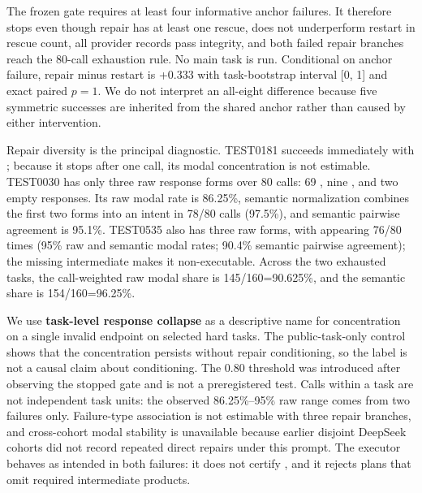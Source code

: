 \documentclass{article}
\begin{document}
The frozen gate requires at least four informative anchor failures. It therefore stops even though repair has at least one rescue, does not underperform restart in rescue count, all provider records pass integrity, and both failed repair branches reach the 80-call exhaustion rule. No main task is run. Conditional on anchor failure, repair minus restart is +0.333 with task-bootstrap interval [0, 1] and exact paired \(p=1\). We do not interpret an all-eight difference because five symmetric successes are inherited from the shared anchor rather than caused by either intervention.

Repair diversity is the principal diagnostic. TEST0181 succeeds immediately with \texttt{}; because it stops after one call, its modal concentration is not estimable. TEST0030 has only three raw response forms over 80 calls: 69 \texttt{\detokenize{["IMPOSSIBLE"]}}, nine \texttt{}, and two empty responses. Its raw modal rate is 86.25\%, semantic normalization combines the first two forms into an \texttt{} intent in 78/80 calls (97.5\%), and semantic pairwise agreement is 95.1\%. TEST0535 also has three raw forms, with \texttt{} appearing 76/80 times (95\% raw and semantic modal rates; 90.4\% semantic pairwise agreement); the missing intermediate \texttt{} makes it non-executable. Across the two exhausted tasks, the call-weighted raw modal share is 145/160=90.625\%, and the semantic share is 154/160=96.25\%.

We use \textbf{task-level response collapse} as a descriptive name for concentration on a single invalid endpoint on selected hard tasks. The public-task-only control shows that the concentration persists without repair conditioning, so the label is not a causal claim about conditioning. The 0.80 threshold was introduced after observing the stopped gate and is not a preregistered test. Calls within a task are not independent task units: the observed 86.25\%--95\% raw range comes from two failures only. Failure-type association is not estimable with three repair branches, and cross-cohort modal stability is unavailable because earlier disjoint DeepSeek cohorts did not record repeated direct repairs under this prompt. The executor behaves as intended in both failures: it does not certify \texttt{}, and it rejects plans that omit required intermediate products.
\end{document}
